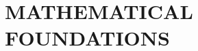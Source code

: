\documentclass[12pt,letterpaper]{article}
\begin{document}
%
%
%
%
%
%
%
%
%
%

\section*{MATHEMATICAL FOUNDATIONS}
\end{document}
